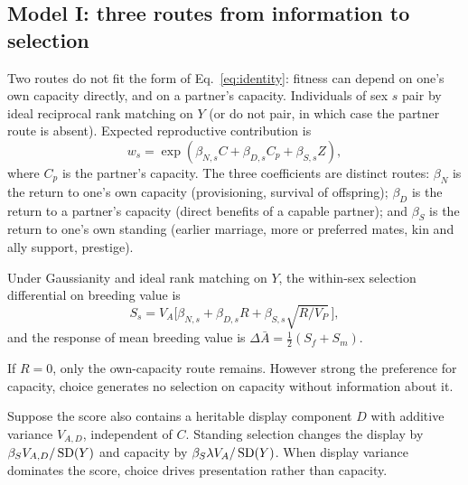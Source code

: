 \subsection{Model I: three routes from information to selection}

Two routes do not fit the form of Eq.~\eqref{eq:identity}: fitness can depend on one's own capacity directly, and on a
partner's capacity. Individuals of sex $s$ pair by ideal reciprocal rank matching on $Y$ (or do not pair, in which case the
partner route is absent). Expected reproductive contribution is
\begin{equation}
w_s=\exp(\beta_{N,s}C+\beta_{D,s}C_p+\beta_{S,s}Z),\label{eq:routes}
\end{equation}
where $C_p$ is the partner's capacity. The three coefficients are distinct routes: $\beta_N$ is the return to one's own
capacity (provisioning, survival of offspring); $\beta_D$ is the return to a partner's capacity (direct benefits of a capable
partner); and $\beta_S$ is the return to one's own standing (earlier marriage, more or preferred mates, kin and ally
support, prestige).

\begin{proposition}\label{prop:routes}
Under Gaussianity and ideal rank matching on $Y$, the within-sex selection differential on breeding value is
\begin{equation}
S_s=V_A\Big[\beta_{N,s}+\beta_{D,s}R+\beta_{S,s}\sqrt{R/V_P}\,\Big],\label{eq:threeroute}
\end{equation}
and the response of mean breeding value is $\Delta\bar A=\tfrac12(S_f+S_m)$.
\end{proposition}

\begin{corollary}\label{cor:bottleneck}
If $R=0$, only the own-capacity route remains. However strong the preference for capacity, choice generates no selection on
capacity without information about it.
\end{corollary}

\begin{corollary}\label{cor:score}
Suppose the score also contains a heritable display component $D$ with additive variance $V_{A,D}$, independent of $C$.
Standing selection changes the display by $\beta_SV_{A,D}/\operatorname{SD}(Y)$ and capacity by $\beta_S\lambda V_A/\operatorname{SD}(Y)$. When display
variance dominates the score, choice drives presentation rather than capacity.
\end{corollary}

